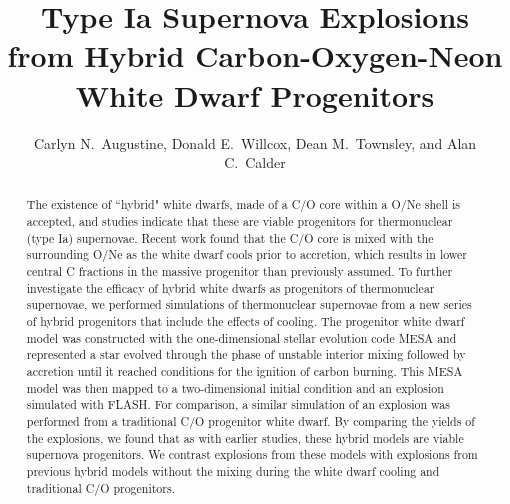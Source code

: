\documentclass[iop,apj]{emulateapj}
\begin{document}
\title{Type Ia Supernova Explosions from Hybrid Carbon-Oxygen-Neon White Dwarf Progenitors}

\author{
Carlyn N.\ Augustine,
Donald E.\ Willcox,
Dean M.\ Townsley,
and Alan C.\ Calder
}


\begin{abstract}
The existence of ``hybrid" white dwarfs, made of a C/O
core within a O/Ne shell is accepted, and studies indicate that these are
viable progenitors for thermonuclear (type Ia) supernovae.
Recent work found that the C/O core is mixed with the surrounding O/Ne
as the white dwarf cools prior to accretion, which results in lower central
C fractions in the massive progenitor than previously assumed. To further
investigate the efficacy of hybrid white dwarfs as progenitors of
thermonuclear supernovae, we performed simulations of thermonuclear
supernovae from a new series of hybrid progenitors that include the
effects of cooling. The progenitor white dwarf model
was constructed with the one-dimensional stellar evolution code MESA and
represented a star evolved through the phase of unstable interior mixing
followed by accretion until it reached conditions for the ignition of
carbon burning. This MESA model was then mapped to a two-dimensional initial
condition and an explosion simulated with FLASH. For comparison, a similar
simulation of an explosion was performed from a traditional C/O progenitor
white dwarf. By comparing the yields of the explosions, we found that as
with earlier studies, these hybrid models are viable supernova progenitors.
We contrast explosions from these models with explosions
from previous hybrid models
{\color{red} without the mixing during the white dwarf cooling}
and traditional C/O progenitors.
\end{abstract}

\end{document}
